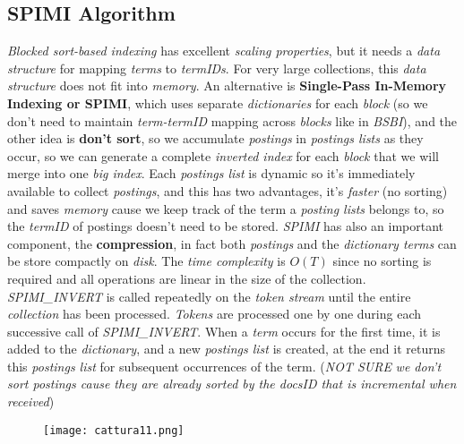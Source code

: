 \documentclass{article}
\begin{document}
\subsection{SPIMI Algorithm}
\emph{Blocked sort-based indexing} has excellent \emph{scaling properties}, but it needs a \emph{data structure} for mapping \emph{terms} to \emph{termIDs}. For very large collections, this \emph{data structure} does not fit into \emph{memory}. An alternative is \textbf{Single-Pass In-Memory Indexing or SPIMI}, which uses separate \emph{dictionaries} for each \emph{block} (so we don't need to maintain \emph{term-termID} mapping across \emph{blocks} like in \emph{BSBI}), and the other idea is \textbf{don't sort}, so we accumulate \emph{postings} in \emph{postings lists} as they occur, so we can generate a complete \emph{inverted index} for each \emph{block} that we will merge into one \emph{big index}. Each \emph{postings list} is dynamic so it's immediately available to collect \emph{postings}, and this has two advantages, it's \emph{faster} (no sorting) and saves \emph{memory} cause we keep track of the term a \emph{posting lists} belongs to, so the \emph{termID} of postings doesn't need to be stored. \emph{SPIMI} has also an important component, the \textbf{compression}, in fact both \emph{postings} and the \emph{dictionary terms} can be store compactly on \emph{disk}. The \emph{time complexity} is $O(T)$ since no sorting is required and all operations are linear in the size of the collection. \emph{SPIMI\_INVERT} is called repeatedly on the \emph{token stream} until the entire \emph{collection} has been processed. \emph{Tokens} are processed one by one during each successive call of \emph{SPIMI\_INVERT}. When a \emph{term} occurs for the first time, it is added to the \emph{dictionary}, and a new \emph{postings list} is created, at the end it returns this \emph{postings list} for subsequent occurrences of the term. (\emph{NOT SURE} \emph{we don't sort postings cause they are already sorted by the docsID that is incremental when received})
 \begin{figure}[H]
  \centering
  \texttt{[image: cattura11.png]}
\end{figure}
\end{document}

